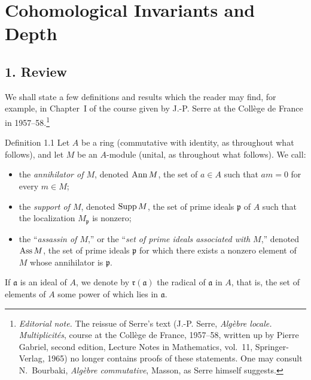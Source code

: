 \makeatletter
\providecommand{\sgareaderlabel}[2]{%
  \begingroup
  \def\@currentlabel{#2}%
  \phantomsection\label{#1}%
  \endgroup}
\makeatother

\chapter{Cohomological Invariants and Depth}
\label{III}

\section*{1. Review}
\sgareaderlabel{III.1}{1}

We shall state a few definitions and results which the reader may
find, for example, in Chapter~I of the course given by J.-P. Serre at the
Collège de France in 1957--58.\footnote{\sgareaderlabel{noteserre}{*}\textit{Editorial note.} The
reissue of Serre's text (J.-P. Serre, \emph{Algèbre locale.
Multiplicités}, course at the Collège de France, 1957--58, written up by
Pierre Gabriel, second edition, Lecture Notes in Mathematics, vol.~11,
Springer-Verlag, 1965) no longer contains proofs of these statements. One may
consult N.~Bourbaki, \emph{Algèbre commutative}, Masson, as Serre himself
suggests.}

\begin{sgastatement}{Definition 1.1}\sgareaderlabel{def:III.1.1}{1.1}
Let $A$ be a ring (commutative with identity, as throughout what follows), and
let $M$ be an $A$-module (unital, as throughout what follows). We call:
\begin{itemize}[leftmargin=2.2em]
  \item the \emph{annihilator of $M$}, denoted $\operatorname{Ann} M$, the set of
  $a\in A$ such that $am=0$ for every $m\in M$;
  \item the \emph{support of $M$}, denoted $\operatorname{Supp} M$, the set of prime
  ideals $\mathfrak p$ of $A$ such that the localization $M_{\mathfrak p}$
  is nonzero;
  \item the “\emph{assassin of $M$},” or the “\emph{set of prime ideals
  associated with $M$},” denoted $\operatorname{Ass} M$, the set of prime ideals
  $\mathfrak p$ for which there exists a nonzero element of $M$ whose
  annihilator is $\mathfrak p$.
\end{itemize}
If $\mathfrak a$ is an ideal of $A$, we denote by $\mathfrak r(\mathfrak a)$
the radical of $\mathfrak a$ in $A$, that is, the set of elements of $A$ some
power of which lies in $\mathfrak a$.
\end{sgastatement}

